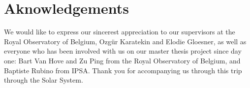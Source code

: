 \section*{Aknowledgements}
\label{aknowlegdements}

We would like to express our sincerest appreciation to our supervisors at the Royal Observatory of Belgium, Ozgür Karatekin and Elodie Gloesner, as well as everyone who has been involved with us on our master thesis project since day one: Bart Van Hove and Zu Ping from the Royal Observatory of Belgium, and Baptiste Rubino from IPSA. Thank you for accompanying us through this trip through the Solar System. 
